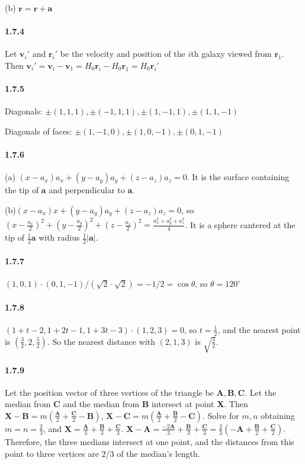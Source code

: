 \documentclass[a4paper]{article}
\begin{document}
(b) $\mathbf{r}=\mathbf{r}+\mathbf{a}$

\paragraph{1.7.4}
Let $\mathbf{v}_i'$ and $\mathbf{r}_i'$ be the velocity and position of the $i$th galaxy viewed from $\mathbf{r}_1$. Then $\mathbf{v}_i'=\mathbf{v}_i-\mathbf{v}_1=H_0\mathbf{r}_i-H_0\mathbf{r}_1=H_0\mathbf{r}_i'$

\paragraph{1.7.5}
Diagonals: $\pm(1,1,1), \pm(-1,1,1), \pm(1,-1,1), \pm(1,1,-1)$

Diagonals of faces: $\pm(1,-1,0),\pm(1,0,-1),\pm(0,1,-1)$

\paragraph{1.7.6}
(a) $(x-a_x)a_x+(y-a_y)a_y+(z-a_z)a_z=0$. It is the surface containing the tip of $\mathbf{a}$ and perpendicular to $\mathbf{a}$.

(b)$(x-a_x)x+(y-a_y)a_y+(z-a_z)a_z=0$, so $(x-\frac{a_x}{2})^2+(y-\frac{a_y}{2})^2+(z-\frac{a_z}{2})^2=\frac{a_x^2+a_y^2+a_z^2}{4}$. It is a sphere cantered at the tip of $\frac{1}{2}\mathbf{a}$ with radius  $\frac{1}{2}|\mathbf{a}|$.

\paragraph{1.7.7}
$(1,0,1)\cdot(0,1,-1)/(\sqrt{2}\cdot\sqrt{2})=-1/2=\cos{\theta}$, so $\theta=120^\circ$

\paragraph{1.7.8}
$(1+t-2,1+2t-1,1+3t-3)\cdot(1,2,3)=0$, so $t=\frac{1}{2}$, and the nearest point is $(\frac{3}{2},2,\frac{5}{2})$. So the nearest distance with $(2,1,3)$ is $\sqrt{\frac{3}{2}}$.

\paragraph{1.7.9}
Let the position vector of three vertices of the triangle be $\mathbf{A}, \mathbf{B}, \mathbf{C}$. Let the median from \textbf{C} and the median from \textbf{B} intersect at point \textbf{X}. Then $\mathbf{X}-\mathbf{B}=m(\frac{\mathbf{A}}{2}+\frac{\mathbf{C}}{2}-\mathbf{B})$,  $\mathbf{X}-\mathbf{C}=m(\frac{\mathbf{A}}{2}+\frac{\mathbf{B}}{2}-\mathbf{C})$. Solve for $m,n$ obtaining $m=n=\frac{2}{3}$, and $\mathbf{X}=\frac{\mathbf{A}}{3}+\frac{\mathbf{B}}{3}+\frac{\mathbf{C}}{3}$. $\mathbf{X}-\mathbf{A}=\frac{-2\mathbf{A}}{3}+\frac{\mathbf{B}}{3}+\frac{\mathbf{C}}{3}=\frac{2}{3}(-\mathbf{A}+\frac{\mathbf{B}}{2}+\frac{\mathbf{C}}{2})$. Therefore, the three medians intersect at one point, and the distances from this point to three vertices are $2/3$ of the median's length.
\end{document}
